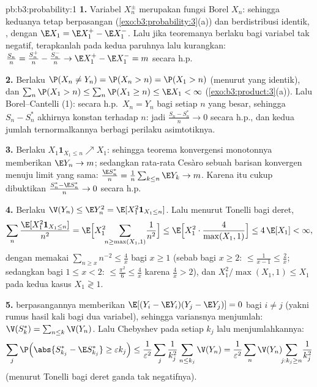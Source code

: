 \begin{solution}{pb:b3:probability:1}
\textbf{1.} Variabel $X_n^{\pm}$ merupakan fungsi Borel $X_n$: sehingga keduanya
tetap  berpasangan
(\cref{exo:b3:probability:3}(a)) dan berdistribusi
identik, , dengan $\E X_1 = \E X_1^+ - \E
X_1^-$. Lalu jika teoremanya berlaku bagi variabel tak negatif,
terapkanlah pada kedua paruhnya lalu kurangkan:
$\frac{S_n}n = \frac{S_n^+}n - \frac{S_n^-}n \to \E X_1^+ -
\E X_1^- = m$ secara h.p.

\textbf{2.} Berlaku $\P(X_n \neq Y_n) = \P(X_n > n) = \P(X_1 > n)$
(menurut  yang identik), dan $\sum_n\P(X_1 > n) \leq \sum_n\P(X_1
\geq n) \leq \E X_1 < \infty$
(\cref{exo:b3:product:3}(a)). Lalu Borel--Cantelli (1): secara h.p.\
$X_n = Y_n$ bagi setiap $n$ yang besar, sehingga $S_n - S_n^*$
akhirnya konstan terhadap $n$: jadi $\frac{S_n - S_n^*}n \to 0$
secara h.p., dan kedua jumlah ternormalkannya berbagi perilaku
asimtotiknya.

\textbf{3.} Berlaku $X_1\mathbf 1_{X_1 \leq n} \nearrow X_1$: sehingga teorema
konvergensi monotonnya memberikan $\E Y_n \to m$; sedangkan rata-rata Cesàro
sebuah barisan konvergen menuju limit yang sama: $\frac{\E S_n^*}n =
\frac1n\sum_{k\leq n}\E Y_k \to m$. Karena itu cukup
dibuktikan $\frac{S^*_n - \E S^*_n}{n} \to 0$ secara h.p.

\textbf{4.} Berlaku $\V(Y_n) \leq \E Y_n^2 = \E[X_1^2\mathbf
1_{X_1\leq n}]$. Lalu menurut Tonelli bagi deret,
\[
\sum_n\frac{\E[X_1^2\mathbf 1_{X_1\leq n}]}{n^2}
= \E\Bigl[X_1^2\!\!\sum_{n \geq \max(X_1, 1)}\!\frac1{n^2}
\Bigr]
\leq \E\Bigl[X_1^2\cdot\frac{4}{\max(X_1,1)}\Bigr]
\leq 4\,\E[X_1] < \infty,
\]
dengan memakai $\sum_{n\geq x}n^{-2} \leq \frac4x$ bagi $x \geq 1$
(sebab bagi $x \geq 2$: $\leq \frac1{x-1} \leq \frac2x$; sedangkan bagi $1
\leq x < 2$: $\leq \frac{\pi^2}6 \leq \frac4x$ karena
$\frac4x > 2$), dan $X_1^2/\max(X_1, 1) \leq X_1$ pada kedua
kasus $X_1 \gtrless 1$.

\textbf{5.}  berpasangannya memberikan $\E[(Y_i - \E
Y_i)(Y_j - \E Y_j)] = 0$ bagi $i \neq j$ (yakni rumus hasil kali
bagi dua variabel), sehingga variansnya menjumlah: $\V(S^*_k) =
\sum_{n\leq k}\V(Y_n)$. Lalu Chebyshev pada setiap $k_j$ lalu
menjumlahkannya:
\[
\sum_j\P\Bigl(\abs{S^*_{k_j} - \E S^*_{k_j}} \geq
\varepsilon k_j\Bigr)
\leq \frac1{\varepsilon^2}\sum_j\frac1{k_j^2}\sum_{n\leq
k_j}\V(Y_n)
= \frac1{\varepsilon^2}\sum_n\V(Y_n)\!\!\sum_{j : k_j\geq
n}\!\frac1{k_j^2}
\]
(menurut Tonelli bagi deret ganda tak negatifnya).


\end{solution}
